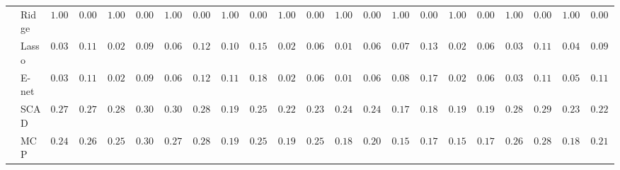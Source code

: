 \begin{tabular}{ll|ll|llllll|llllll|llllll}
 & Ridge  & $1.0000$ & $0.0000$ & $1.0000$ & $0.0000$ & $1.0000$ & $0.0000$ & $1.0000$ & $0.0000$ & $1.0000$ & $0.0000$ & $1.0000$ & $0.0000$ & $1.0000$ & $0.0000$ & $1.0000$ & $0.0000$ & $1.0000$ & $0.0000$ & $1.0000$ & $0.0000$ \\
 & Lasso  & $0.0300$ & $0.1193$ & $0.0217$ & $0.0907$ & $0.0600$ & $0.1220$ & $0.1000$ & $0.1553$ & $0.0217$ & $0.0655$ & $0.0183$ & $0.0666$ & $0.0700$ & $0.1385$ & $0.0217$ & $0.0611$ & $0.0367$ & $0.1100$ & $0.0433$ & $0.0966$ \\
 & E-net  & $0.0300$ & $0.1193$ & $0.0233$ & $0.0948$ & $0.0650$ & $0.1273$ & $0.1167$ & $0.1812$ & $0.0217$ & $0.0655$ & $0.0183$ & $0.0666$ & $0.0850$ & $0.1700$ & $0.0217$ & $0.0611$ & $0.0367$ & $0.1150$ & $0.0517$ & $0.1129$ \\
 & SCAD  & $0.2767$ & $0.2755$ & $0.2850$ & $0.3027$ & $0.3083$ & $0.2827$ & $0.1967$ & $0.2522$ & $0.2283$ & $0.2341$ & $0.2483$ & $0.2433$ & $0.1717$ & $0.1887$ & $0.1900$ & $0.1939$ & $0.2833$ & $0.2935$ & $0.2333$ & $0.2235$ \\
 & MCP  & $0.2417$ & $0.2684$ & $0.2533$ & $0.3057$ & $0.2767$ & $0.2894$ & $0.1933$ & $0.2548$ & $0.1967$ & $0.2500$ & $0.1800$ & $0.2006$ & $0.1500$ & $0.1796$ & $0.1550$ & $0.1761$ & $0.2600$ & $0.2826$ & $0.1850$ & $0.2144$ \\
\hline 
\end{tabular}

